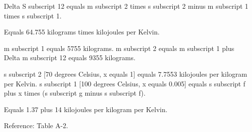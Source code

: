 Delta S subscript 12 equals m subscript 2 times s subscript 2 minus m subscript 1 times s subscript 1.  

Equals 64.755 kilograms times kilojoules per Kelvin.  

m subscript 1 equals 5755 kilograms.  
m subscript 2 equals m subscript 1 plus Delta m subscript 12 equals 9355 kilograms.  

s subscript 2 [70 degrees Celsius, x equals 1] equals 7.7553 kilojoules per kilogram per Kelvin.  
s subscript 1 [100 degrees Celsius, x equals 0.005] equals s subscript f plus x times (s subscript g minus s subscript f).  

Equals 1.37 plus 14 kilojoules per kilogram per Kelvin.  

Reference: Table A-2.